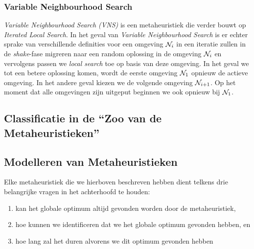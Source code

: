 \subsubsection{Variable Neighbourhood Search}

\emph{Variable Neighbourhood Search (VNS)} is een metaheuristiek die verder bouwt op \emph{Iterated Local Search}. In het geval van \emph{Variable Neighbourhood Search} is er echter sprake van verschillende definities voor een omgeving $\mathcal{N}_i$ in een iteratie zullen in de \emph{shake}-fase migreren naar een random oplossing in de omgeving $\mathcal{N}_i$ en vervolgens passen we \emph{local search} toe op basis van deze omgeving. In het geval we tot een betere oplossing komen, wordt de eerste omgeving $\mathcal{N}_1$ opnieuw de actieve omgeving. In het andere geval kiezen we de volgende omgeving $\mathcal{N}_{i+1}$. Op het moment dat alle omgevingen zijn uitgeput beginnen we ook opnieuw bij $\mathcal{N}_1$.%

% 

\subsection{Classificatie in de ``Zoo van de Metaheuristieken''}

\subsection{Modelleren van Metaheuristieken}

Elke metaheuristiek die we hierboven beschreven hebben dient telkens drie belangrijke vragen in het achterhoofd te houden\cite{DBLP:journals/jc/ShonkwilerV94}:
\begin{enumerate}
 \item kan het globale optimum altijd gevonden worden door de metaheuristiek,
 \item hoe kunnen we identificeren dat we het globale optimum gevonden hebben, en
 \item hoe lang zal het duren alvorens we dit optimum gevonden hebben
\end{enumerate}

